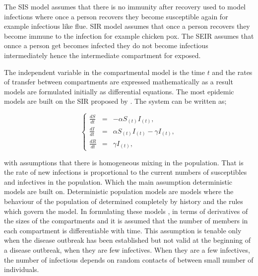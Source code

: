 The SIS model assumes that there is no immunity after recovery used to model infections where once a person recovers they become susceptible again for example infectious like flue. SIR model assumes that once a person recovers they become immune to the infection for example chicken pox. The SEIR assumes that onnce a person get becomes infected they do not  become infectious intermediately hence the intermediate compartment for exposed. 

The independent variable in the compartmental model is the time $t$ and the rates of transfer between compartments are expressed mathematically as a result models are formulated initially as differential equations. The most epidemic models are built on the SIR proposed by \cite{m1925applications}. The system can be written as;


\begin{center}
\begin{equation} \label{eqn1_1}
\left\lbrace \begin{array}{ccl}
\frac{dS}{dt} &= &-\alpha S_{(t)} I_{(t)},\\
 \frac{dI}{dt} &=& \alpha S_{(t)} I_{(t)} - \gamma  I_{(t)}, \\
 \frac{dR}{dt} &= &\gamma  I_{(t)},
\end{array} \right. 
\end{equation}
\end{center}


with assumptions that there is homogeneous mixing in the population. That is the rate of new infections is proportional to the current numbers of susceptibles and infectives in the population. Which the main assumption deterministic models are built on. Deterministic population  models are models where the behaviour of the population of determined completely by history and the rules which govern the model. In formulating these models , in terms of derivatives of the sizes of the compartments and it is assumed that the number of members in each compartment is differentiable with time. This assumption is tenable only when the disease outbreak has been established  but not valid at the beginning of a disease outbreak, when they are few infectives. When they are a few infectives, the number of infectious depends on random contacts of between small number of individuals.

